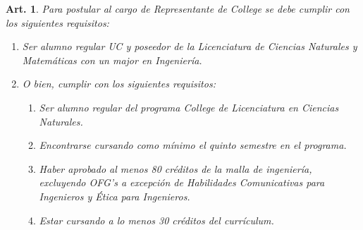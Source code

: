 \documentclass[letterpaper,11pt]{article}
\theoremstyle{plain}
\newtheorem{art}{Art.} %
\begin{document}
		\begin{art}\label{requisitosRepresentanteCollege}
			Para postular al cargo de Representante de College se debe cumplir con los siguientes requisitos:
			\begin{enumerate}
				\item Ser alumno regular UC y poseedor de la Licenciatura de Ciencias Naturales y Matemáticas con un major en Ingeniería. 
				\item O bien, cumplir con los siguientes requisitos:
					\begin{enumerate}
						\item Ser alumno regular del programa College de Licenciatura en Ciencias Naturales.
						\item Encontrarse cursando como mínimo el quinto semestre en el programa.
						\item Haber aprobado al menos 80 créditos de la malla de ingeniería, excluyendo OFG’s a excepción de Habilidades Comunicativas para Ingenieros y Ética para Ingenieros. 
						\item Estar cursando a lo menos 30 créditos del currículum. 
					\end{enumerate}
			\end{enumerate}
		\end{art}
\end{document}
